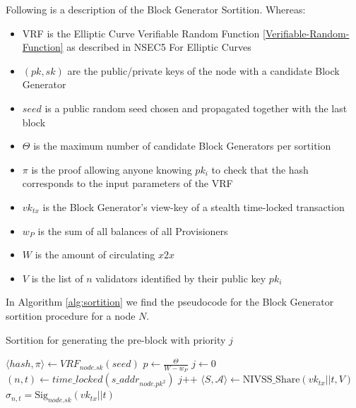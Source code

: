 Following is a description of the Block Generator Sortition. Whereas: 

\begin{itemize}
\item VRF is the Elliptic Curve Verifiable Random Function \ref{Verifiable-Random-Function} as described in NSEC5 For Elliptic Curves \cite{ecurves}
\item $(pk, sk)$ are the public/private keys of the node with a candidate Block Generator
\item $seed$ is a public random seed chosen and propagated together with the last block
\item $\Theta$ is the maximum number of candidate Block Generators per sortition
\item $\pi$ is the proof allowing anyone knowing $pk_i$ to check that the hash corresponds to the input parameters of the VRF
\item $vk_{tx}$ is the Block Generator's view-key of a stealth time-locked transaction
\item $w_P$ is the sum of all balances of all Provisioners
\item $W$ is the amount of circulating $x2x$
\item $V$ is the list of $n$ validators identified by their public key $pk_i$
\end{itemize}

In Algorithm \ref{alg:sortition} we find the pseudocode for the Block Generator sortition procedure for a node $N$.

    \begin{algorithm}
        \caption{Sortition for generating the pre-block with priority $j$}
        \label{alg:sortition}
        \begin{algorithmic}[1]
                \State $\langle hash, \pi\rangle \leftarrow VRF_{node.sk}(seed)$
                \State $p \leftarrow \frac{\Theta}{W-w_P}$ 
                \State $j \leftarrow 0$
                \State $(n, t) \leftarrow time\_locked(s\_addr_{node.pk^2})$ 
                \While{$\frac{hash}{2^{len(hash)}} \notin [ \sum_{k=0}^j Pr(k;n,p), \sum_{k=0}^{j+1} Pr(k;n,p))$}
                	\State $j \textrm{++}$
                	\State $\langle S, \mathcal{A} \rangle \leftarrow \textrm{NIVSS\_Share}(vk_{tx}||t, V)$
                	\State $\sigma_{n,t}=\textrm{Sig}_{node.sk}(vk_{tx}|| t)$
                \EndWhile
            \EndProcedure
        \end{algorithmic}
    \end{algorithm}


